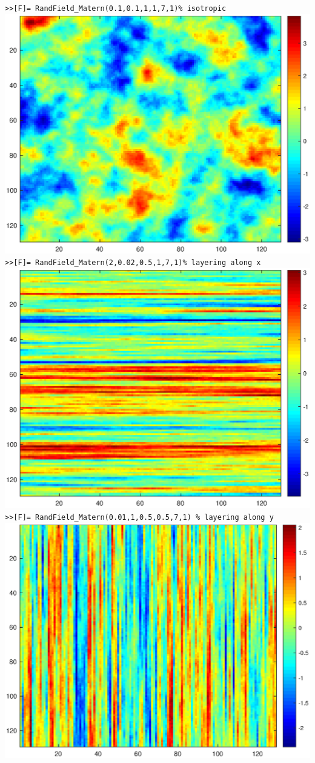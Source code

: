 \documentclass{extarticle}
\begin{document}
\vspace{1cm}
\texttt{>>[F]= RandField\_Matern(0.1,0.1,1,1,7,1)\% isotropic}\\
\centering
\includegraphics[scale=0.4]{f1.eps}\\
\texttt{>>[F]= RandField\_Matern(2,0.02,0.5,1,7,1)\% layering along x}\\
\centering
\includegraphics[scale=0.4]{f2.eps}\\
\texttt{>>[F]= RandField\_Matern(0.01,1,0.5,0.5,7,1) \% layering along y}\\
\centering
\includegraphics[scale=0.4]{f3.eps}
\end{document}

